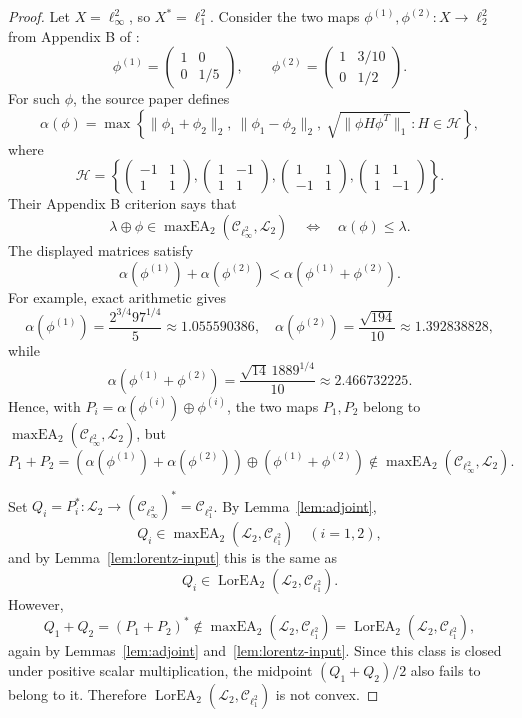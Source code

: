 \documentclass[11pt]{article}
\newcommand{\cC}{\mathcal C}
\newcommand{\cL}{\mathcal L}
\newcommand{\maxEA}{\operatorname{maxEA}}
\newcommand{\LorEA}{\operatorname{LorEA}}
\begin{document}
\begin{proof}
Let \(X=\ell_\infty^2\), so \(X^*=\ell_1^2\).  Consider the two maps
\(\phi^{(1)},\phi^{(2)}:X\to\ell_2^2\) from Appendix B of
\cite{lapiana-muellerhermes}:
\[
\phi^{(1)}=
\begin{pmatrix}
1&0\\
0&1/5
\end{pmatrix},
\qquad
\phi^{(2)}=
\begin{pmatrix}
1&3/10\\
0&1/2
\end{pmatrix}.
\]
For such \(\phi\), the source paper defines
\[
\alpha(\phi)=\max\left\{
\|\phi_1+\phi_2\|_2,\ \|\phi_1-\phi_2\|_2,\
\sqrt{\|\phi H\phi^T\|_1}: H\in\mathcal H
\right\},
\]
where
\[
\mathcal H=\left\{
\begin{pmatrix}-1&1\\1&1\end{pmatrix},
\begin{pmatrix}1&-1\\1&1\end{pmatrix},
\begin{pmatrix}1&1\\-1&1\end{pmatrix},
\begin{pmatrix}1&1\\1&-1\end{pmatrix}
\right\}.
\]
Their Appendix B criterion says that
\[
\lambda\oplus\phi\in \maxEA_2(\cC_{\ell_\infty^2},\cL_2)
\quad\Longleftrightarrow\quad
\alpha(\phi)\leq\lambda.
\]
The displayed matrices satisfy
\[
\alpha(\phi^{(1)})+\alpha(\phi^{(2)})
<\alpha(\phi^{(1)}+\phi^{(2)}).
\]
For example, exact arithmetic gives
\[
\alpha(\phi^{(1)})=\frac{2^{3/4}97^{1/4}}{5}\approx 1.055590386,
\quad
\alpha(\phi^{(2)})=\frac{\sqrt{194}}{10}\approx 1.392838828,
\]
while
\[
\alpha(\phi^{(1)}+\phi^{(2)})
=\frac{\sqrt{14}\,1889^{1/4}}{10}\approx 2.466732225.
\]
Hence, with \(P_i=\alpha(\phi^{(i)})\oplus\phi^{(i)}\), the two maps
\(P_1,P_2\) belong to \(\maxEA_2(\cC_{\ell_\infty^2},\cL_2)\), but
\[
P_1+P_2=(\alpha(\phi^{(1)})+\alpha(\phi^{(2)}))
\oplus(\phi^{(1)}+\phi^{(2)})
\notin \maxEA_2(\cC_{\ell_\infty^2},\cL_2).
\]

Set \(Q_i=P_i^*:\cL_2\to(\cC_{\ell_\infty^2})^*=\cC_{\ell_1^2}\).  By
Lemma~\ref{lem:adjoint},
\[
Q_i\in\maxEA_2(\cL_2,\cC_{\ell_1^2})
\quad (i=1,2),
\]
and by Lemma~\ref{lem:lorentz-input} this is the same as
\[
Q_i\in\LorEA_2(\cL_2,\cC_{\ell_1^2}).
\]
However,
\[
Q_1+Q_2=(P_1+P_2)^*
\notin\maxEA_2(\cL_2,\cC_{\ell_1^2})
=\LorEA_2(\cL_2,\cC_{\ell_1^2}),
\]
again by Lemmas~\ref{lem:adjoint} and~\ref{lem:lorentz-input}.  Since this
class is closed under positive scalar multiplication, the midpoint
\((Q_1+Q_2)/2\) also fails to belong to it.  Therefore
\(\LorEA_2(\cL_2,\cC_{\ell_1^2})\) is not convex.
\end{proof}
\end{document}
